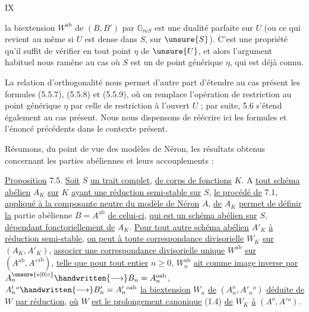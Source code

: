 \hfill IX

la biextension $W^{\mathrm{ab}}$ de $(B,B')$ par $\mathbb G_{mS}$ est une dualité parfaite sur $U$ (ou ce qui revient au même si $U$ est dense dans $S$, sur $\unsure{S}$). C'est une propriété qu'il suffit de vérifier en tout point $\eta$ de $\unsure{U}$, et alors l'argument habituel nous ramène au cas où $S$ est un  de point générique $\eta$, qui est déjà connu.

La relation d'orthogonalité nous permet d'autre part d'étendre au cas présent les formules (5.5.7), (5.5.8) et (5.5.9), où on remplace l'opération de restriction au point générique $\eta$ par celle de restriction à l'ouvert $U$ ; par suite, 5.6 s'étend également au cas présent. Nous nous dispensons de réécrire ici les formules et l'énoncé précédents dans le contexte présent.

Résumons, du point de vue des modèles de Néron, les résultats obtenus concernant les parties abéliennes et leurs accouplements :

\uline{Proposition} 7.5. \uline{Soit} $S$ \uline{un trait complet}, \uline{de corps de fonctions} $K$. A \uline{tout schéma abélien} $A_K$ \uline{sur} $K$ \uline{ayant une réduction semi-stable sur} $S$, \uline{le procédé de} 7.1, \uline{appliqué à la composante neutre du modèle de Néron} $A$, \uline{de} $A_K$ \uline{permet de définir la} partie abélienne $B=A^{\mathrm{ab}}$ \uline{de celui-ci}, \uline{qui est un schéma abélien sur} $S$, \uline{dépendant fonctoriellement de} $A_K$. \uline{Pour tout autre schéma abélien} $A'_K$ \uline{à réduction semi-stable}, \uline{on peut à toute correspondance divisorielle} $W_K$ \uline{sur} $(A_K,A'_K)$, \uline{associer une correspondance divisorielle unique} $W^{\mathrm{ab}}$ \uline{sur} $(A^{\mathrm{ab}},A'^{\mathrm{ab}})$, \uline{telle que pour tout entier} $n\geq 0$, $W_n^{\mathrm{ab}}$ \uline{ait comme image inverse par} $A_n^{\unsure{o|0|\circ}}\handwritten{\longrightarrow} B_n=A_n^{o\mathrm{ab}}$, $A'_n{}^o\handwritten{\longrightarrow} B'_n=A'_n{}^{o\mathrm{ab}}$ \uline{la biextension} $W_n$ \uline{de} $(A_n^o,A'_n{}^o)$ \uline{déduite de} $W$ \uline{par réduction}, \uline{où} $W$ \uline{est le prolongement canonique} (1.4) \uline{de} $W_K$ \uline{à} $(A^o,A'{}^o)$.

